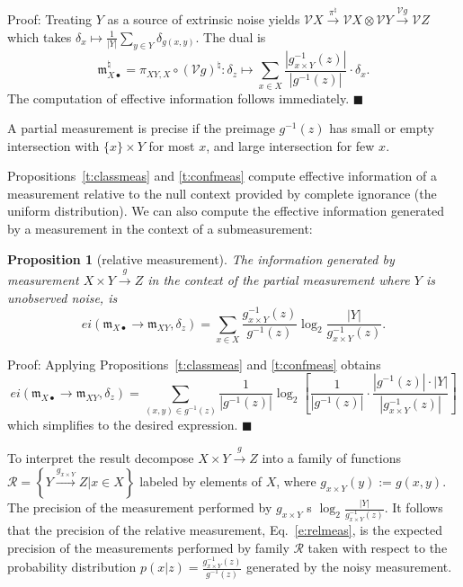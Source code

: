 \documentclass[12pt]{article}
\newcommand{\vecify}{{\mathcal V}}
\newcommand{\eop}{{$\blacksquare$}}
\newcommand{\fm}{{\mathfrak m}}
\newtheorem{prop}[thm]{Proposition}
\theoremstyle{remark}
\begin{document}
\noindent
Proof: Treating $Y$ as a source of extrinsic noise yields 
$\vecify X\xrightarrow{\pi^\natural}\vecify X\otimes 
\vecify Y\xrightarrow{\vecify g}\vecify Z$ which takes 
$\delta_x\mapsto \frac{1}{|Y|}\sum_{y\in Y}\delta_{g(x,y)}$. 
The dual is
\begin{equation*}
    \fm_{X\bullet}^\natural=\pi_{XY,X}\circ 
    (\vecify g)^\natural:\delta_z\mapsto \sum_{x\in X}
    \frac{|g^{-1}_{x\times Y}(z)|}{|g^{-1}(z)|}\cdot\delta_x.
\end{equation*}	
The computation of effective information follows immediately. 
\eop

A partial measurement is precise if the preimage $g^{-1}(z)$ 
has small or empty intersection with $\{x\}\times Y$ for most 
$x$, and large intersection for few $x$.

Propositions~\ref{t:classmeas} and \ref{t:confmeas} compute 
effective information of a measurement relative to the null 
context provided by complete ignorance (the uniform 
distribution). We can also compute the effective information 
generated by a measurement in the context of a submeasurement:

\begin{prop}
	[relative measurement]
	\label{t:relmeas}
	The information generated by measurement $X\times Y\xrightarrow{g}Z$ in the context of the partial measurement where $Y$ is unobserved noise, is
	\begin{equation}
		\label{e:relmeas}
		ei(\fm_{X\bullet}\rightarrow \fm_{XY},\delta_z)=
		\sum_{x\in X} \frac{g^{-1}_{x\times Y}(z)}{g^{-1}(z)}\log_2
		\frac{|Y|}{g^{-1}_{x\times Y}(z)}.
	\end{equation}
\end{prop}

\noindent
Proof: Applying Propositions~\ref{t:classmeas} and 
\ref{t:confmeas} obtains
\begin{equation*}
	ei(\fm_{X\bullet}\rightarrow \fm_{XY},\delta_z)=
	\sum_{(x,y)\in g^{-1}(z)}\frac{1}{|g^{-1}(z)|}
    \log_2\left[
	\frac{1}{|g^{-1}(z)|}\cdot\frac{|g^{-1}(z)|\cdot|Y|}
    {|g^{-1}_{x\times Y}(z)|}
	\right]
\end{equation*}
which simplifies to the desired expression. 
\eop

To interpret the result decompose $X\times Y\xrightarrow{g} Z$ 
into a family of functions $\mathcal{R}=
\left\{Y\xrightarrow{g_{x\times Y}}Z\big|x\in X\right\}$ 
labeled by elements of $X$, where $g_{x\times Y}(y):=g(x,y)$. 
The precision of the measurement performed by $g_{x\times Y}$ 
s $\log_2\frac{|Y|}{g^{-1}_{x\times Y}(z)}$. It follows that 
the precision of the relative measurement, 
Eq.~\eqref{e:relmeas}, is the expected precision of the 
measurements performed by family $\mathcal{R}$ taken with 
respect to the probability distribution 
$p(x|z)=\frac{g^{-1}_{x\times Y}(z)}{g^{-1}(z)}$ generated by
the noisy measurement.
\end{document}
